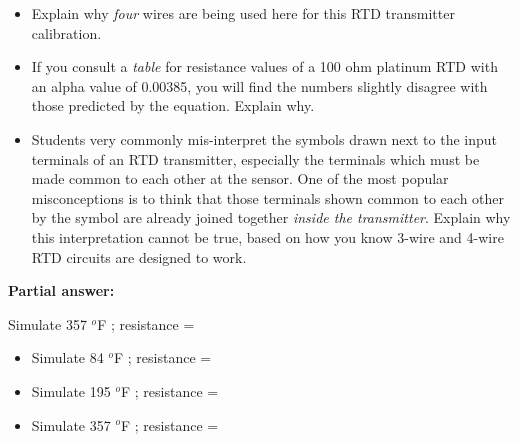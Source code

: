 \begin{itemize}
\item{} Explain why {\it four} wires are being used here for this RTD transmitter calibration.
\item{} If you consult a {\it table} for resistance values of a 100 ohm platinum RTD with an alpha value of 0.00385, you will find the numbers slightly disagree with those predicted by the equation.  Explain why.
\item{} Students very commonly mis-interpret the symbols drawn next to the input terminals of an RTD transmitter, especially the terminals which must be made common to each other at the sensor.  One of the most popular misconceptions  is to think that those terminals shown common to each other by the symbol are already joined together {\it inside the transmitter}.  Explain why this interpretation cannot be true, based on how you know 3-wire and 4-wire RTD circuits are designed to work.
\end{itemize}







\noindent
{\bf Partial answer:}

\vskip 10pt

\item{} Simulate 357 $^{o}$F ; resistance =  \hskip 10pt  







\begin{itemize}
\item{} Simulate 84 $^{o}$F ; resistance =  \hskip 10pt 
\vskip 10pt
\item{} Simulate 195 $^{o}$F ; resistance =  \hskip 10pt 
\vskip 10pt
\item{} Simulate 357 $^{o}$F ; resistance =  \hskip 10pt  
\end{itemize}

\vfil \eject

